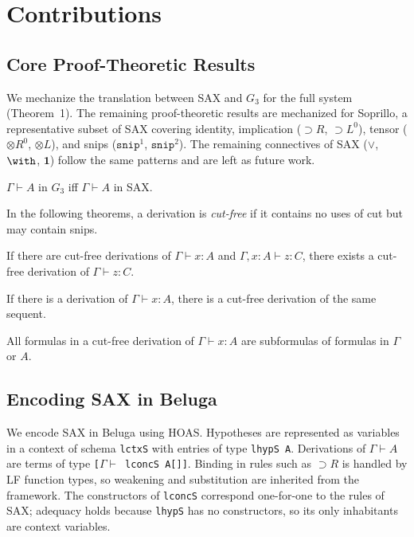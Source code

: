 \section{Contributions}
\label{section:contribution}

\subsection{Core Proof-Theoretic Results}

We mechanize the translation between SAX and $G_3$ for the full system
(Theorem~1). The remaining proof-theoretic results are mechanized for
Soprillo, a representative subset of SAX covering identity, implication
(${\supset}R$, ${\supset}L^0$), tensor (${\otimes}R^0$, ${\otimes}L$),
and snips ($\texttt{snip}^1$, $\texttt{snip}^2$). The remaining
connectives of SAX (${\vee}$, ${\with}$, $\mathbf{1}$) follow the same
patterns and are left as future work.

\begin{theorem}
  $\Gamma \vdash A$ in $G_3$ iff $\Gamma \vdash A$ in SAX.
\end{theorem}

In the following theorems, a derivation is \emph{cut-free} if it
contains no uses of cut but may contain snips.

\begin{theorem}
  If there are cut-free derivations of $\Gamma \vdash x : A$ and
  $\Gamma, x : A \vdash z : C$, there exists a cut-free derivation of
  $\Gamma \vdash z : C$.
\end{theorem}

\begin{theorem}
  If there is a derivation of $\Gamma \vdash x : A$, there is a
  cut-free derivation of the same sequent.
\end{theorem}

\begin{theorem}
  All formulas in a cut-free derivation of $\Gamma \vdash x : A$ are
  subformulas of formulas in $\Gamma$ or $A$.
\end{theorem}

\subsection{Encoding SAX in Beluga}

We encode SAX in Beluga using HOAS. Hypotheses are represented as
variables in a context of schema \texttt{lctxS} with entries of type
\texttt{lhypS~A}. Derivations of $\Gamma \vdash A$ are terms of type
\texttt{[$\Gamma \vdash$  lconcS~A[]]}. Binding in rules such as ${\supset}R$
is handled by LF function types, so weakening and substitution are
inherited from the framework. The constructors of \texttt{lconcS}
correspond one-for-one to the rules of SAX; adequacy holds because
\texttt{lhypS} has no constructors, so its only inhabitants are context
variables.

